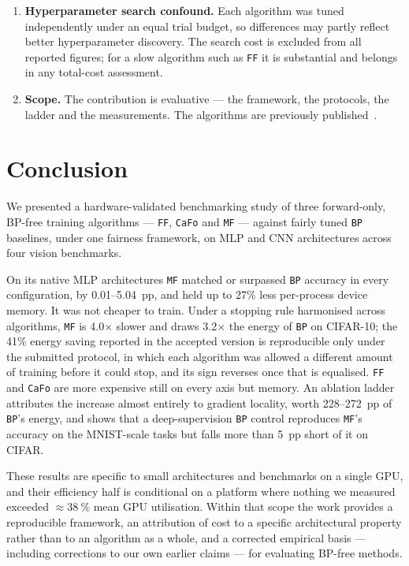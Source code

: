 \documentclass{llncs}
\newcommand{\FF}{\texttt{FF}}
\newcommand{\MF}{\texttt{MF}}
\newcommand{\BP}{\texttt{BP}}
\newcommand{\CaFo}{\texttt{CaFo}}
\begin{document}
\begin{enumerate}
  \item \textbf{Hyperparameter search confound.} Each algorithm was tuned
        independently under an equal trial budget, so differences may partly
        reflect better hyperparameter discovery. The search cost is excluded
        from all reported figures; for a slow algorithm such as \FF{} it is
        substantial and belongs in any total-cost assessment.
  \item \textbf{Scope.} The contribution is evaluative --- the framework,
        the protocols, the ladder and the measurements. The algorithms are
        previously
        published~\cite{hinton2022forward,zhao2023cafo,gong2025mono}.
\end{enumerate}


\section{Conclusion}
\label{sec:conclusion}

We presented a hardware-validated benchmarking study of three forward-only,
BP-free training algorithms --- \FF{}, \CaFo{} and \MF{} --- against fairly
tuned \BP{} baselines, under one fairness framework, on MLP and CNN
architectures across four vision benchmarks.

On its native MLP architectures \MF{} matched or surpassed \BP{} accuracy in
every configuration, by \numrange{0.01}{5.04}~pp, and held up to \num{27}\%
less per-process device memory. It was not cheaper to train. Under a stopping
rule harmonised across algorithms, \MF{} is \num{4.0}$\times$ slower and draws
\num{3.2}$\times$ the energy of \BP{} on CIFAR-10; the \num{41}\% energy
saving reported in the accepted version is reproducible only under the
submitted protocol, in which each algorithm was allowed a different amount of
training before it could stop, and its sign reverses once that is equalised.
\FF{} and \CaFo{} are more expensive still on every axis but memory. An
ablation ladder attributes the increase almost entirely to gradient locality,
worth \numrange{228}{272}~pp of \BP{}'s energy, and shows that a
deep-supervision \BP{} control reproduces \MF{}'s accuracy on the MNIST-scale
tasks but falls more than \num{5}~pp short of it on CIFAR.

These results are specific to small architectures and benchmarks on a single
GPU, and their efficiency half is conditional on a platform where nothing we
measured exceeded ${\approx}\SI{38}{\percent}$ mean GPU utilisation. Within
that scope the work provides a reproducible framework, an attribution of cost
to a specific architectural property rather than to an algorithm as a whole,
and a corrected empirical basis --- including corrections to our own earlier
claims --- for evaluating BP-free methods.
\end{document}
